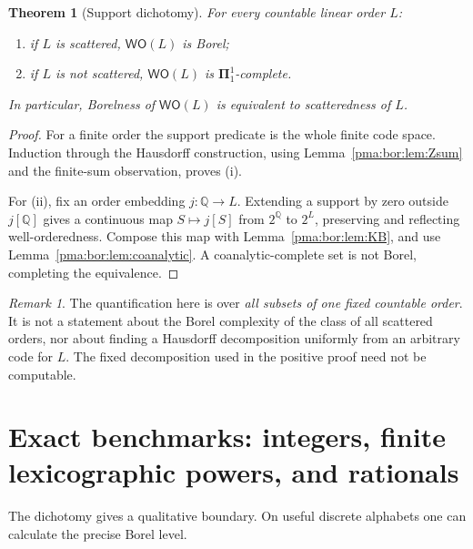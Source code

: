 \documentclass[11pt]{article}
\numberwithin{equation}{section}
\newtheorem{theorem}{Theorem}[section]
\theoremstyle{definition}
\theoremstyle{remark}
\newtheorem{remark}[remark]{Remark}
\newcommand{\Q}{\mathbb Q}
\newcommand{\WO}{\mathsf{WO}}
\begin{document}
\begin{theorem}[Support dichotomy]
\label{pma:bor:thm:dichotomy}
For every countable linear order $L$:
\begin{enumerate}[label=(\roman*)]
\item if $L$ is scattered, $\WO(L)$ is Borel;
\item if $L$ is not scattered, $\WO(L)$ is
$\boldsymbol\Pi^1_1$-complete.
\end{enumerate}
In particular, Borelness of $\WO(L)$ is equivalent to scatteredness of $L$.
\end{theorem}
\begin{proof}
For a finite order the support predicate is the whole finite code space.
Induction through the Hausdorff construction, using
Lemma~\ref{pma:bor:lem:Zsum} and the finite-sum observation, proves (i).

For (ii), fix an order embedding $j:\Q\to L$. Extending a support by zero
outside $j[\Q]$ gives a continuous map $S\mapsto j[S]$ from $2^\Q$ to
$2^L$, preserving and reflecting well-orderedness. Compose this map with
Lemma~\ref{pma:bor:lem:KB}, and use Lemma~\ref{pma:bor:lem:coanalytic}.
A coanalytic-complete set is not Borel, completing the equivalence.
\end{proof}

\begin{remark}
The quantification here is over \emph{all subsets of one fixed countable
order}. It is not a statement about the Borel complexity of the class of all
scattered orders, nor about finding a Hausdorff decomposition uniformly from
an arbitrary code for $L$. The fixed decomposition used in the positive proof
need not be computable.
\end{remark}

\section{Exact benchmarks: integers, finite lexicographic powers, and rationals}
\label{pma:bor:sec:lex}

The dichotomy gives a qualitative boundary. On useful discrete alphabets one
can calculate the precise Borel level.
\end{document}
